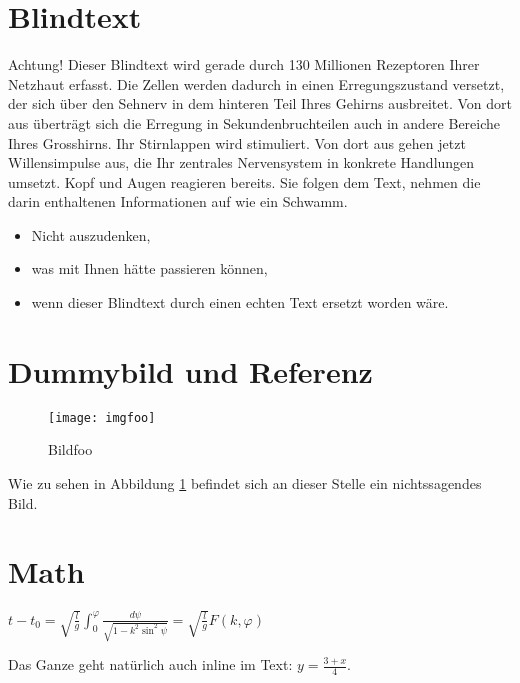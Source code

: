 \documentclass[a4paper,parskip=half,oneside]{scrbook}
\begin{document}
\section{Blindtext}
Achtung! Dieser Blindtext wird gerade durch 130 Millionen Rezeptoren Ihrer Netzhaut erfasst. Die Zellen werden dadurch in einen Erregungszustand versetzt, der sich über den Sehnerv in dem hinteren Teil Ihres Gehirns ausbreitet. Von dort aus übertr\"agt sich die Erregung in Sekundenbruchteilen auch in andere Bereiche Ihres Grosshirns. Ihr Stirnlappen wird stimuliert. Von dort aus gehen jetzt Willensimpulse aus, die Ihr zentrales Nervensystem in konkrete Handlungen umsetzt. Kopf und Augen reagieren bereits. Sie folgen dem Text, nehmen die darin enthaltenen Informationen auf wie ein Schwamm.

\begin{itemize}
  \item Nicht auszudenken,
  \item was mit Ihnen h\"atte passieren können,
  \item wenn dieser Blindtext durch einen echten Text ersetzt worden w\"are.
\end{itemize}

\section{Dummybild und Referenz}

  \begin{figure}[htbp]
    \centering
    \texttt{[image: imgfoo]}
    \caption{Bildfoo}
    \label{img:foo}
  \end{figure}

Wie zu sehen in Abbildung \ref{img:foo} befindet sich an dieser Stelle ein nichtssagendes Bild.

\section{Math}
\begin{math}
	t-t_{0}=\sqrt{\frac{l}{g}}\int_{0}^{\varphi}{\frac{d\psi}{\sqrt{1-k^{2}\sin^{2} {\psi}}}} = \sqrt{\frac{l}{g}} F(k,\varphi)
\end{math}

Das Ganze geht natürlich auch inline im Text: $y=\frac{3 + x}{4}$.
\end{document}
